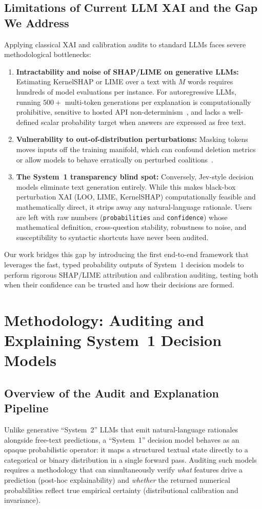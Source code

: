 \documentclass[10pt]{article}
\begin{document}
\subsection{Limitations of Current LLM XAI and the Gap We Address}
Applying classical XAI and calibration audits to standard LLMs faces severe methodological bottlenecks:
\begin{enumerate}
\item \textbf{Intractability and noise of SHAP/LIME on generative LLMs:} Estimating KernelSHAP or LIME over a text with $M$ words requires hundreds of model evaluations per instance. For autoregressive LLMs, running $500+$ multi-token generations per explanation is computationally prohibitive, sensitive to hosted API non-determinism~\cite{atil2025nondeterminism}, and lacks a well-defined scalar probability target when answers are expressed as free text.
\item \textbf{Vulnerability to out-of-distribution perturbations:} Masking tokens moves inputs off the training manifold, which can confound deletion metrics~\cite{hooker2019} or allow models to behave erratically on perturbed coalitions~\cite{slack2020}.
\item \textbf{The System~1 transparency blind spot:} Conversely, Jev-style decision models eliminate text generation entirely. While this makes black-box perturbation XAI (LOO, LIME, KernelSHAP) computationally feasible and mathematically direct, it strips away any natural-language rationale. Users are left with raw numbers (\texttt{probabilities} and \texttt{confidence}) whose mathematical definition, cross-question stability, robustness to noise, and susceptibility to syntactic shortcuts have never been audited.
\end{enumerate}
Our work bridges this gap by introducing the first end-to-end framework that leverages the fast, typed probability outputs of System~1 decision models to perform rigorous SHAP/LIME attribution and calibration auditing, testing both when their confidence can be trusted and how their decisions are formed.

\section{Methodology: Auditing and Explaining System~1 Decision Models}
\label{sec:method}

\subsection{Overview of the Audit and Explanation Pipeline}
Unlike generative ``System~2'' LLMs that emit natural-language rationales alongside free-text predictions, a ``System~1'' decision model behaves as an opaque probabilistic operator: it maps a structured textual state directly to a categorical or binary distribution in a single forward pass.
Auditing such models requires a methodology that can simultaneously verify \emph{what} features drive a prediction (post-hoc explainability) and \emph{whether} the returned numerical probabilities reflect true empirical certainty (distributional calibration and invariance).
\end{document}

